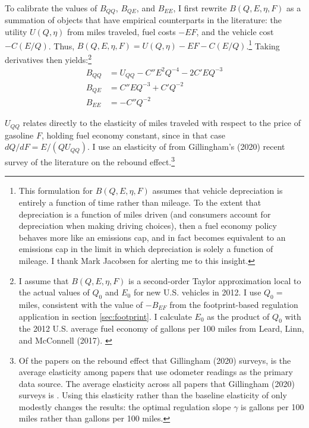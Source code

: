 \documentclass[12pt]{article}
\begin{document}
To calibrate the values of $B_{QQ}$, $B_{QE}$, and $B_{EE}$, I first rewrite $B(Q,E,\eta,F)$ as a summation of objects that have empirical counterparts in the literature: the utility $U(Q,\eta)$ from miles traveled, fuel costs $-EF$, and the vehicle cost $-C(E/Q)$. Thus, $B(Q,E,\eta,F)=U(Q,\eta)-EF-C(E/Q)$.\footnote{This formulation for $B(Q,E,\eta,F)$ assumes that vehicle depreciation is entirely a function of time rather than mileage. To the extent that depreciation is a function of miles driven (and consumers account for depreciation when making driving choices), then a fuel economy policy behaves more like an emissions cap, and in fact becomes equivalent to an emissions cap in the limit in which depreciation is solely a function of mileage. I thank Mark Jacobsen for alerting me to this insight.} Taking derivatives then yields:\footnote{I assume that $B(Q,E,\eta,F)$ is a second-order Taylor approximation local to the actual values of $Q_0$ and $E_0$ for new U.S. vehicles in 2012. I use $Q_0=$ miles, consistent with the value of $-B_{EF}$ from the footprint-based regulation application in section \ref{sec:footprint}. I calculate $E_0$ as the product of $Q_0$ with the 2012 U.S. average fuel economy of gallons per 100 miles from Leard, Linn, and McConnell (2017). \label{fn:Q_0}}
\begin{align}
B_{QQ}&=U_{QQ}-C''E^2Q^{-4}-2C'EQ^{-3} \label{eq:BQQvmt} \\
B_{QE}&=C''EQ^{-3}+C'Q^{-2} \label{eq:BQEvmt} \\
B_{EE}&=-C''Q^{-2} \label{eq:BEEvmt}
\end{align}

$U_{QQ}$ relates directly to the elasticity of miles traveled with respect to the price of gasoline $F$, holding fuel economy constant, since in that case $dQ/dF=E/(QU_{QQ})$. I use an elasticity of from Gillingham's (2020) recent survey of the literature on the rebound effect.\footnote{Of the papers on the rebound effect that Gillingham (2020) surveys, is the average elasticity among papers that use odometer readings as the primary data source. The average elasticity across all papers that Gillingham (2020) surveys is \unskip. Using this elasticity rather than the baseline elasticity of only modestly changes the results: the optimal regulation slope $\gamma$ is gallons per 100 miles rather than gallons per 100 miles.} 
\end{document}
